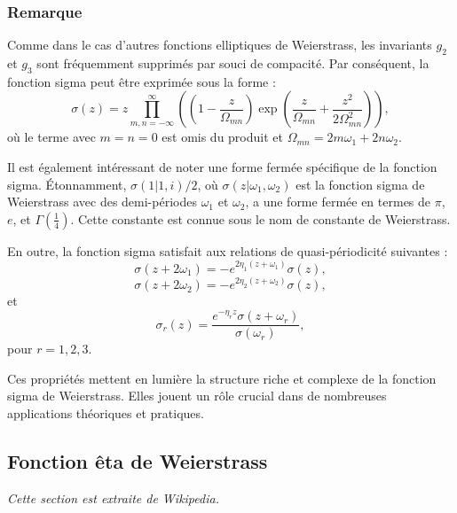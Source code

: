 \documentclass[12pt]{article}
\begin{document}
                        \subsubsection{Remarque}
                        
                        
                        Comme dans le cas d'autres fonctions elliptiques de Weierstrass, les invariants $g_2$ et $g_3$ sont fréquemment supprimés par souci de compacité. Par conséquent, la fonction sigma peut être exprimée sous la forme :
                        \[
                        \sigma (z) = z \prod_{m,n=-\infty}^{\infty} \left( \left( 1 - \frac{z}{\Omega_{mn}} \right) \exp \left( \frac{z}{\Omega_{mn}} + \frac{z^2}{2 \Omega_{mn}^2} \right) \right), \tag{3}
                        \]
                        où le terme avec $m = n = 0$ est omis du produit et $\Omega_{mn} = 2 m \omega_1 + 2 n \omega_2$.
                        
                        
                        Il est également intéressant de noter une forme fermée spécifique de la fonction sigma. Étonnamment, $\sigma (1 | 1, i)/2$, où $\sigma (z | \omega_1, \omega_2)$ est la fonction sigma de Weierstrass avec des demi-périodes $\omega_1$ et $\omega_2$, a une forme fermée en termes de $\pi$, $e$, et $\Gamma \left( \frac{1}{4} \right)$. Cette constante est connue sous le nom de constante de Weierstrass.
                        
                        En outre, la fonction sigma satisfait aux relations de quasi-périodicité suivantes :
                        \[
                        \sigma (z + 2 \omega_1) = -e^{2 \eta_1 (z + \omega_1)} \sigma (z), \tag{4}
                        \]
                        \[
                        \sigma (z + 2 \omega_2) = -e^{2 \eta_2 (z + \omega_2)} \sigma (z), \tag{5}
                        \]
                        et
                        \[
                        \sigma_r (z) = \frac{e^{-\eta_r z} \sigma (z + \omega_r)}{\sigma (\omega_r)}, \tag{6}
                        \]
                        pour $r = 1, 2, 3$.
                        
                        Ces propriétés mettent en lumière la structure riche et complexe de la fonction sigma de Weierstrass. Elles jouent un rôle crucial dans de nombreuses applications théoriques et pratiques.
                                                

                        \subsection{Fonction êta de Weierstrass}
                        \textit{Cette section est extraite de Wikipedia.}
\end{document}
